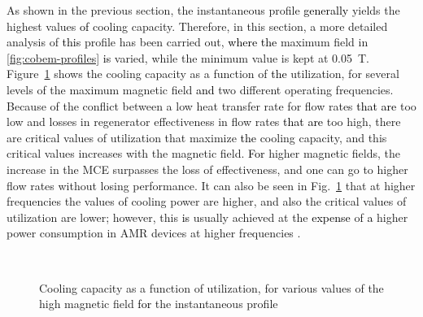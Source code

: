 \documentclass[referee]{svjour3}
\begin{document}
As shown in the previous section, the instantaneous profile \textcolor{black}{generally} yields the highest values \textcolor{black}{of} cooling capacity. Therefore, in this section, a more detailed analysis of \textcolor{black}{this} profile has been carried out, \textcolor{black}{where the} maximum field in \autoref{fig:cobem-profiles} \textcolor{black}{is} varied, while the minimum value is kept at \SI{0.05}{\tesla}. Figure~\ref{fig:qc_phi_inst} shows the cooling capacity as a function of \textcolor{black}{the} utilization, for several levels of the maximum magnetic field \textcolor{black}{and} two different operating frequencies. Because of the conflict between a low heat transfer rate for flow rates \textcolor{black}{that are} too low and losses in regenerator effectiveness in flow rates \textcolor{black}{that are} too high, there are critical values of utilization that maximize \textcolor{black}{the} cooling capacity, and this critical values increases with the magnetic field. \textcolor{black}{For} higher magnetic fields, the increase in the MCE surpasses the loss of effectiveness, and one can go to higher flow rates without losing performance. It can also be seen in Fig.~\ref{fig:qc_phi_inst} that at  higher frequencies the values of cooling power are higher, and also the critical values of utilization are lower; however, this \textcolor{black}{is} usually achieved at the \textcolor{black}{expense} of \textcolor{black}{a} higher power consumption in AMR devices at higher frequencies \cite{bib:lei15_study,NIKNIA2016601}.

\begin{figure}[!ht]
  \centering
{}
\,
  \caption{Cooling capacity as a function of utilization, for various values of the high magnetic field  \textcolor{black}{for} the instantaneous profile}
  \label{fig:qc_phi_inst}
\end{figure}
\end{document}
